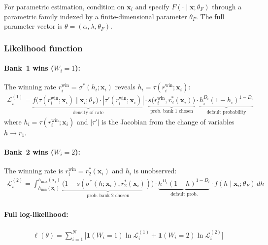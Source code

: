 \documentclass[12pt]{article}
\theoremstyle{plain}
\theoremstyle{plain}
\theoremstyle{definition}  %
\theoremstyle{remark}  %
\begin{document}
For parametric estimation, condition on $\mathbf{x}_i$ and specify $F(\cdot \mid \mathbf{x};\theta_F)$ through a parametric family indexed by a finite-dimensional parameter $\theta_F$. The full parameter vector is $\theta = (\alpha, \lambda, \theta_F)$.

\subsubsection{Likelihood function}

\paragraph{Bank~1 wins ($W_i = 1$):} The winning rate $r_i^{\text{win}} = \sigma^*(h_i; \mathbf{x}_i)$ reveals $h_i = \tau(r_i^{\text{win}}; \mathbf{x}_i)$:
\begin{align}\label{eq:L1}
    \mathcal{L}_i^{(1)} = \underbrace{f\!\big(\tau(r_i^{\text{win}}; \mathbf{x}_i) \mid \mathbf{x}_i;\theta_F\big) \cdot |\tau'(r_i^{\text{win}}; \mathbf{x}_i)|}_{\text{density of rate}} \cdot \underbrace{s\!\big(r_i^{\text{win}}, r_2^*(\mathbf{x}_i)\big)}_{\text{prob.\ bank~1 chosen}} \cdot \underbrace{h_i^{D_i}(1-h_i)^{1-D_i}}_{\text{default probability}}
\end{align}
where $h_i = \tau(r_i^{\text{win}}; \mathbf{x}_i)$ and $|\tau'|$ is the Jacobian from the change of variables $h \to r_1$.

\paragraph{Bank~2 wins ($W_i = 2$):} The winning rate is $r_i^{\text{win}} = r_2^*(\mathbf{x}_i)$ and $h_i$ is unobserved:
\begin{align}\label{eq:L2}
    \mathcal{L}_i^{(2)} = \int_{h_{\min}(\mathbf{x}_i)}^{h_{\max}(\mathbf{x}_i)} \underbrace{\big(1-s(\sigma^*(h;\mathbf{x}_i), r_2^*(\mathbf{x}_i))\big)}_{\text{prob.\ bank~2 chosen}} \cdot \underbrace{h^{D_i}(1-h)^{1-D_i}}_{\text{default prob.}} \cdot f(h \mid \mathbf{x}_i;\theta_F)\, dh
\end{align}

\paragraph{Full log-likelihood:}
\begin{align}\label{eq:loglik}
    \ell(\theta) = \sum_{i=1}^N \Big[\mathbf{1}(W_i=1)\ln \mathcal{L}_i^{(1)} + \mathbf{1}(W_i=2)\ln \mathcal{L}_i^{(2)}\Big]
\end{align}
\end{document}
